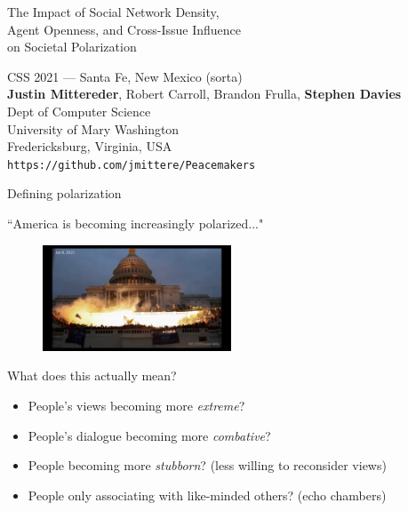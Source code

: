 \documentclass[12pt]{beamer}
\author{Mittereder, \textit{et. al.}}
\begin{document}
\begin{frame}[c]{} %

\begin{center}
\Large
The Impact of Social Network Density,\\Agent Openness, and Cross-Issue
Influence\\on Societal Polarization

\footnotesize
\vspace{.3in}
CSS 2021 --- Santa Fe, New Mexico (sorta)\\
\vspace{.1in}
\textbf{Justin Mittereder}, Robert Carroll, Brandon Frulla,
\textbf{Stephen Davies}\\
\scriptsize
\smallskip
Dept of Computer Science\\
University of Mary Washington\\
Fredericksburg, Virginia, USA\\
\bigskip
\bigskip
\texttt{https://github.com/jmittere/Peacemakers}
\end{center}

\end{frame}

\begin{frame}[c]{Defining polarization} %

\large

\centering
``America is becoming increasingly polarized..."

\vspace{-.2in}
\begin{figure}
\includegraphics[width=0.50\textwidth]{images/capitol.png}
\end{figure}
\pause
\vspace{-.2in}
What does this actually mean?
\vspace{-.15in}
\pause

\small
\begin{itemize}
\itemsep.1em
\item People's views becoming more \textit{extreme}?
\pause
\item People's dialogue becoming more \textit{combative}?
\pause
\item People becoming more \textit{stubborn}? (less willing to reconsider views)
\pause
\item People only associating with like-minded others? (echo chambers)
\end{itemize}

\end{frame}
\end{document}
